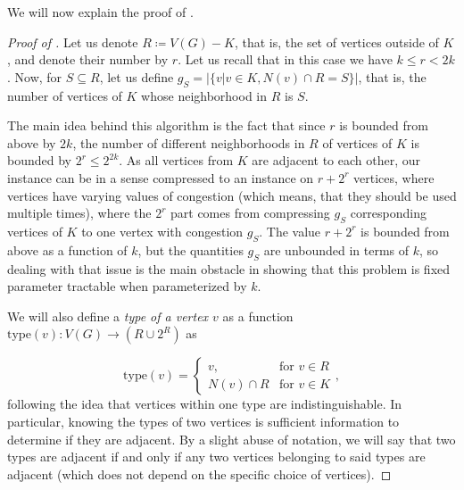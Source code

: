 \documentclass[a4paper,11pt]{article}
\begin{document}
We will now explain the proof of .

\begin{proof}[Proof of ]
Let us denote $R \coloneqq V(G) - K$, that is, the set of vertices outside of $K$, and denote their number by $r$. Let us recall that in this case we have $k \le r < 2k$. 
Now, for $S \subseteq R$, 
let us define $g_S = |\{v | v \in K, N(v) \cap R = S\}|$, that is, the number of vertices of $K$ whose neighborhood in $R$ is $S$.

The main idea behind this algorithm is the fact that since $r$ is bounded from above by $2k$, the number of different neighborhoods in $R$ of vertices of $K$ is bounded by $2^{r} \le 2^{2k}$. As all vertices from $K$ are adjacent to each other, our instance can be in a sense compressed to an instance on $r+2^r$ vertices, where vertices have varying values of congestion (which means, that they should be used multiple times), where the $2^r$ part comes from compressing $g_S$ corresponding vertices of $K$ to one vertex with congestion $g_S$. The value $r+2^r$ is bounded from above as a function of $k$, but the quantities $g_S$ are unbounded in terms of $k$, so dealing with that issue is the main obstacle in showing that this problem is fixed parameter tractable when parameterized by $k$.

We will also define a \emph{type of a vertex $v$} as a function $\mathrm{type}(v) : V(G) \to (R \cup 2^R)$ as

\begin{equation*}
    \mathrm{type}(v) = 
        \begin{cases}
        v, & \text{for } v \in R \\
        N(v) \cap R & \text{for } v \in K
        \end{cases},
\end{equation*}
following the idea that vertices within one type are indistinguishable. In particular, knowing the types of two vertices is sufficient information to determine if they are adjacent. By a slight abuse of notation, we will say that two types are adjacent if and only if any two vertices belonging to said types are adjacent (which does not depend on the specific choice of vertices).


\end{proof}
\end{document}
